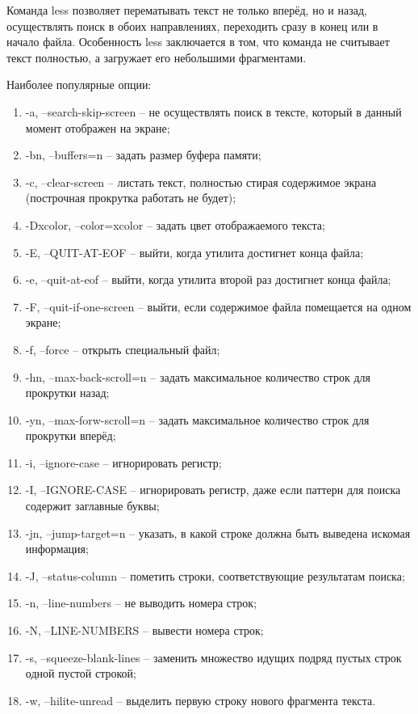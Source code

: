 Команда less позволяет перематывать текст не только вперёд, но и назад, осуществлять поиск в обоих направлениях, переходить сразу в конец или в начало файла. Особенность less заключается в том, что команда не считывает текст полностью, а загружает его небольшими фрагментами.

Наиболее популярные опции:
\begin{enumerate}
    
    \item -a, --search-skip-screen -- не осуществлять поиск в тексте, который в данный момент отображен на экране;
    \item -bn, --buffers=n -- задать размер буфера памяти;
    \item -c, --clear-screen -- листать текст, полностью стирая содержимое экрана (построчная прокрутка работать не будет);
    \item -Dxcolor, --color=xcolor -- задать цвет отображаемого текста;
    \item -E, --QUIT-AT-EOF -- выйти, когда утилита достигнет конца файла;
    \item -e, --quit-at-eof -- выйти, когда утилита второй раз достигнет конца файла;
    \item -F, --quit-if-one-screen -- выйти, если содержимое файла помещается на одном экране;
    \item -f, --force -- открыть специальный файл;
    \item -hn, --max-back-scroll=n -- задать максимальное количество строк для прокрутки назад;
    \item -yn, --max-forw-scroll=n -- задать максимальное количество строк для прокрутки вперёд;
    \item -i, --ignore-case -- игнорировать регистр;
    \item -I, --IGNORE-CASE -- игнорировать регистр, даже если паттерн для поиска содержит заглавные буквы;
    \item -jn, --jump-target=n -- указать, в какой строке должна быть выведена искомая информация;
    \item -J, --status-column -- пометить строки, соответствующие результатам поиска;
    \item -n, --line-numbers -- не выводить номера строк;
    \item -N, --LINE-NUMBERS -- вывести номера строк;
    \item -s, --squeeze-blank-lines -- заменить множество идущих подряд пустых строк одной пустой строкой;
    \item -w, --hilite-unread -- выделить первую строку нового фрагмента текста.
\end{enumerate}

